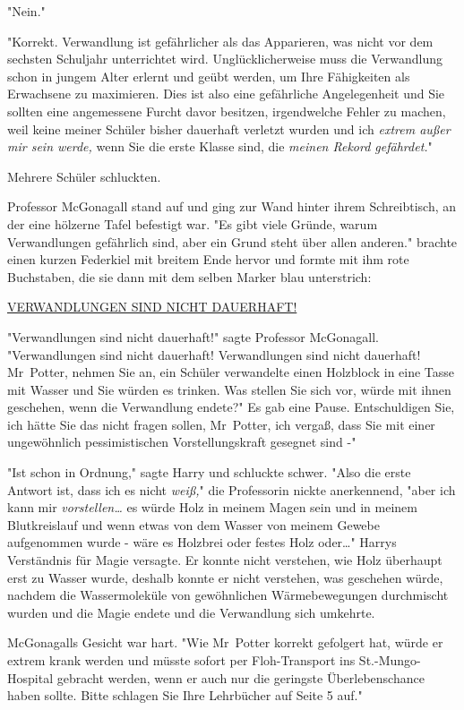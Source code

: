 {"Nein."

"Korrekt. Verwandlung ist gefährlicher als das Apparieren, was nicht vor dem sechsten Schuljahr unterrichtet wird. Unglücklicherweise muss die Verwandlung schon in jungem Alter erlernt und geübt werden, um Ihre Fähigkeiten als Erwachsene zu maximieren. Dies ist also eine gefährliche Angelegenheit und Sie sollten eine angemessene Furcht davor besitzen, irgendwelche Fehler zu machen, weil keine meiner Schüler bisher dauerhaft verletzt wurden und ich \emph{extrem außer mir sein werde,} wenn Sie die erste Klasse sind, die \emph{meinen Rekord gefährdet.}"

Mehrere Schüler schluckten.

Professor McGonagall stand auf und ging zur Wand hinter ihrem Schreibtisch, an der eine hölzerne Tafel befestigt war. "Es gibt viele Gründe, warum Verwandlungen gefährlich sind, aber ein Grund steht über allen anderen." brachte einen kurzen Federkiel mit breitem Ende hervor und formte mit ihm rote Buchstaben, die sie dann mit dem selben Marker blau unterstrich:

\uline{VERWANDLUNGEN SIND NICHT DAUERHAFT!}

"Verwandlungen sind nicht dauerhaft!" sagte Professor McGonagall. "Verwandlungen sind nicht dauerhaft! Verwandlungen sind nicht dauerhaft! Mr~Potter, nehmen Sie an, ein Schüler verwandelte einen Holzblock in eine Tasse mit Wasser und Sie würden es trinken. Was stellen Sie sich vor, würde mit ihnen geschehen, wenn die Verwandlung endete?" Es gab eine Pause. Entschuldigen Sie, ich hätte Sie das nicht fragen sollen, Mr~Potter, ich vergaß, dass Sie mit einer ungewöhnlich pessimistischen Vorstellungskraft gesegnet sind -"

"Ist schon in Ordnung," sagte Harry und schluckte schwer. "Also die erste Antwort ist, dass ich es nicht \emph{weiß,}" die Professorin nickte anerkennend, "aber ich kann mir \emph{vorstellen…} es würde Holz in meinem Magen sein und in meinem Blutkreislauf und wenn etwas von dem Wasser von meinem Gewebe aufgenommen wurde - wäre es Holzbrei oder festes Holz oder…" Harrys Verständnis für Magie versagte. Er konnte nicht verstehen, wie Holz überhaupt erst zu Wasser wurde, deshalb konnte er nicht verstehen, was geschehen würde, nachdem die Wassermoleküle von gewöhnlichen Wärmebewegungen durchmischt wurden und die Magie endete und die Verwandlung sich umkehrte.

McGonagalls Gesicht war hart. "Wie Mr~Potter korrekt gefolgert hat, würde er extrem krank werden und müsste sofort per Floh-Transport ins St.-Mungo-Hospital gebracht werden, wenn er auch nur die geringste Überlebenschance haben sollte. Bitte schlagen Sie Ihre Lehrbücher auf Seite 5 auf."

}
